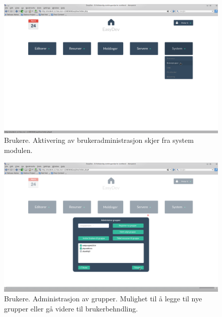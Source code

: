 \begin{figure}[ht]
\includegraphics[width=\textwidth,height=\textheight,keepaspectratio]{./img/prosessdokumentasjon/hifi/b1.png}
\caption[Hi-fi Brukere 1]{Brukere. Aktivering av brukeradministrasjon skjer fra system modulen.}
\label{fig:brukerehi1}
\end{figure}

\begin{figure}[ht]
\includegraphics[width=\textwidth,height=\textheight,keepaspectratio]{./img/prosessdokumentasjon/hifi/b2.png}
\caption[Hi-fi Brukere 2]{Brukere. Administrasjon av grupper. Mulighet til å legge til nye grupper eller gå videre til brukerbehndling.}
\label{fig:brukerehi2}
\end{figure}

